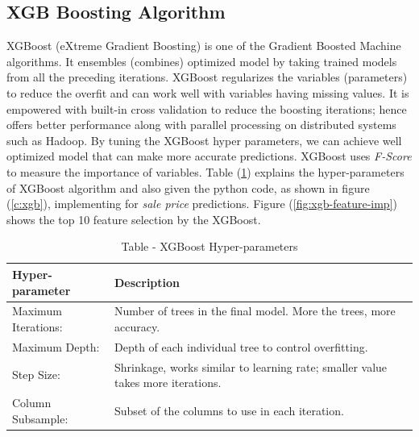 \documentclass[sigconf]{acmart}
\begin{document}
	\subsection{XGB Boosting Algorithm}

	XGBoost (eXtreme Gradient Boosting) is one of the Gradient Boosted Machine algorithms. It ensembles (combines) optimized model by taking trained models from all the preceding iterations. XGBoost regularizes the variables (parameters) to reduce the overfit and can work well with variables having missing values. It is empowered with built-in cross validation to reduce the boosting iterations; hence offers better performance along with parallel processing on distributed systems such as Hadoop. By tuning the XGBoost hyper parameters, we can achieve well optimized model that can make more accurate predictions. XGBoost uses {\em F-Score} to measure the importance of  variables. Table (\ref{tab:xgb-param}) explains the hyper-parameters of XGBoost algorithm and also given the python code, as shown in figure (\ref{c:xgb}), implementing for {\em sale price} predictions. Figure (\ref{fig:xgb-feature-imp}) shows the top 10 feature selection by the XGBoost.
	
	\begin{table}[htb]
		\center
		\caption{Table - XGBoost Hyper-parameters}
		\label{tab:xgb-param}		
		\begin{tabular}{l p{5cm}}
			\toprule
			Hyper-parameter & Description \\
			\midrule
			Maximum Iterations: & Number of trees in the final model. More the trees, more accuracy. \\
			
			Maximum Depth: & Depth of each individual tree to control overfitting. \\
			
			Step Size: & Shrinkage, works similar to learning rate; smaller value takes more iterations. \\
			
			Column Subsample: & Subset of the columns to use in each iteration. \\ 
			\bottomrule
		\end{tabular}
	\end{table}
	
\end{document}
